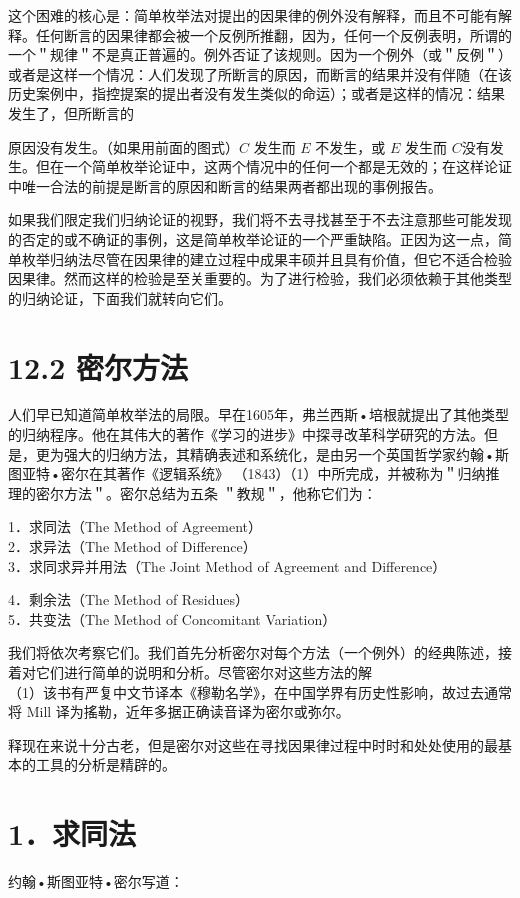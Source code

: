 这个困难的核心是：简单枚举法对提出的因果律的例外没有解释，而且不可能有解释。任何断言的因果律都会被一个反例所推翻，因为，任何一个反例表明，所谓的一个＂规律＂不是真正普遍的。例外否证了该规则。因为一个例外（或＂反例＂）或者是这样一个情况：人们发现了所断言的原因，而断言的结果并没有伴随（在该历史案例中，指控提案的提出者没有发生类似的命运）；或者是这样的情况：结果发生了，但所断言的

原因没有发生。（如果用前面的图式）$C$ 发生而 $E$ 不发生，或 $E$ 发生而 $C$没有发生。但在一个简单枚举论证中，这两个情况中的任何一个都是无效的；在这样论证中唯一合法的前提是断言的原因和断言的结果两者都出现的事例报告。

如果我们限定我们归纳论证的视野，我们将不去寻找甚至于不去注意那些可能发现的否定的或不确证的事例，这是简单枚举论证的一个严重缺陷。正因为这一点，简单枚举归纳法尽管在因果律的建立过程中成果丰硕并且具有价值，但它不适合检验因果律。然而这样的检验是至关重要的。为了进行检验，我们必须依赖于其他类型的归纳论证，下面我们就转向它们。

\section*{12.2 密尔方法}
人们早已知道简单枚举法的局限。早在1605年，弗兰西斯•培根就提出了其他类型的归纳程序。他在其伟大的著作《学习的进步》中探寻改革科学研究的方法。但是，更为强大的归纳方法，其精确表述和系统化，是由另一个英国哲学家约翰•斯图亚特•密尔在其著作《逻辑系统》 （1843）（1）中所完成，并被称为＂归纳推理的密尔方法＂。密尔总结为五条 ＂教规＂，他称它们为：

1．求同法（The Method of Agreement）\\
2．求异法（The Method of Difference）\\
3．求同求异并用法（The Joint Method of Agreement and Difference）

4．剩余法（The Method of Residues）\\
5．共变法（The Method of Concomitant Variation）

我们将依次考察它们。我们首先分析密尔对每个方法（一个例外）的经典陈述，接着对它们进行简单的说明和分析。尽管密尔对这些方法的解\\
（1）该书有严复中文节译本《穆勒名学》，在中国学界有历史性影响，故过去通常将 Mill 译为搖勒，近年多据正确读音译为密尔或弥尔。

释现在来说十分古老，但是密尔对这些在寻找因果律过程中时时和处处使用的最基本的工具的分析是精辟的。

\section*{1．求同法}
约翰•斯图亚特•密尔写道：

